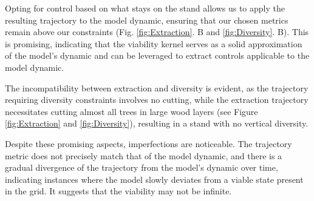 \documentclass{article}
\begin{document}
Opting for control based on what stays on the stand allows us to apply the resulting trajectory to the model dynamic, ensuring that our chosen metrics remain above our constraints (Fig. \ref{fig:Extraction}. B and \ref{fig:Diversity}. B). This is promising, indicating that the viability kernel serves as a solid approximation of the model's dynamic and can be leveraged to extract controls applicable to the model dynamic.

The incompatibility between extraction and diversity is evident, as the trajectory requiring diversity constraints involves no cutting, while the extraction trajectory necessitates cutting almost all trees in large wood layers (see Figure \ref{fig:Extraction} and \ref{fig:Diversity}), resulting in a stand with no vertical diversity.

Despite these promising aspects, imperfections are noticeable. The trajectory metric does not precisely match that of the model dynamic, and there is a gradual divergence of the trajectory from the model's dynamic over time, indicating instances where the model slowly deviates from a viable state present in the grid. It suggests that the viability may not be infinite.
\end{document}
